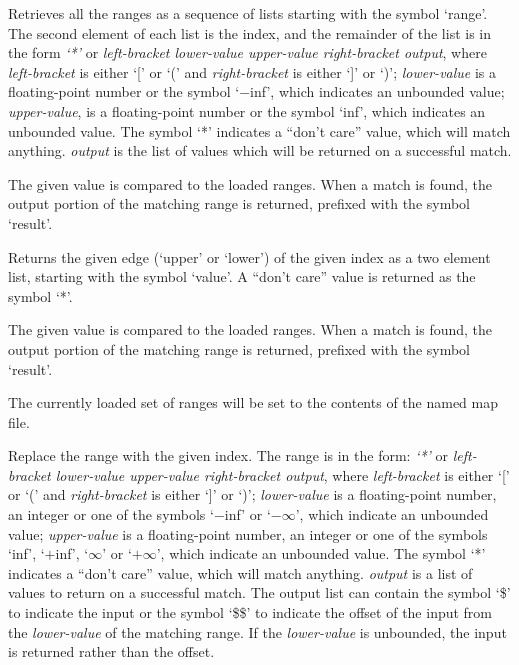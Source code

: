   Retrieves all the ranges as a sequence of lists starting with the symbol `range'.
  The second element of each list is the index, and the remainder of the list is in the form
  \emph{`*'} or \emph{left-bracket lower-value upper-value right-bracket output}, where \emph{left-bracket}
  is either `[' or `(' and \emph{right-bracket} is either `]' or `)';
  \emph{lower-value} is a floating-point number or the symbol `$-$inf',
  which indicates an unbounded value; \emph{upper-value}, is a floating-point number or
  the symbol `inf', which indicates an unbounded value.
  The symbol `*' indicates a ``don't care'' value, which will match anything.
  \emph{output} is the list of values which will be returned on a successful match.

  The given value is compared to the loaded ranges.
  When a match is found, the output portion of the matching range is returned, prefixed with the symbol
  `result'.
  
  Returns the given edge (`upper' or `lower') of the given index as a two element list,
  starting with the symbol `value'.
  A ``don't care'' value is returned as the symbol `*'.

  The given value is compared to the loaded ranges.
  When a match is found, the output portion of the matching range is returned, prefixed with the symbol
  `result'.
  
  The currently loaded set of ranges will be set to the contents of the named map file.
 
  Replace the range with the given index.
  The range is in the form: \emph{`*'} or \emph{left-bracket lower-value upper-value right-bracket output}, where
  \emph{left-bracket} is either `[' or `(' and \emph{right-bracket} is either `]' or `)';
  \emph{lower-value} is a floating-point number, an integer or one of the symbols `$-$inf' or
  `$-\infty$', which indicate an unbounded value;
  \emph{upper-value} is a floating-point number, an integer or one of the symbols
  `inf', `$+$inf', `$\infty$' or `$+\infty$', which indicate an unbounded value.
  The symbol `*' indicates a ``don't care'' value, which will match anything.
  \emph{output} is a list of values to return on a successful match.
  The output list can contain the symbol `\$' to indicate the input or the symbol `\$\$' to
  indicate the offset of the input from the \emph{lower-value} of the matching range.
  If the \emph{lower-value} is unbounded, the input is returned rather than the offset.

